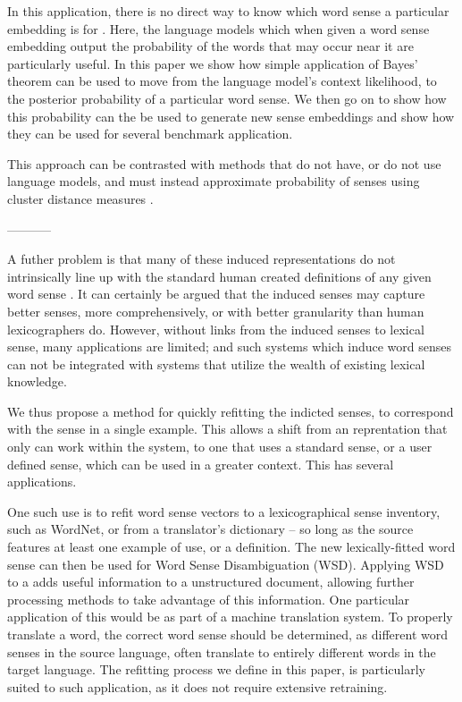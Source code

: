 \documentclass{sig-alternate}
\begin{document}
In this application, there is no direct way to know which word sense a particular embedding is for \parencite{Reisinger2010,Huang2012,AdaGrams}.
Here, the language models which when given a word sense embedding output the probability of the words that may occur near it are particularly useful. In this paper we show how simple application of Bayes' theorem can be used to move from the language model's context likelihood, to the posterior probability of a particular word sense. We then go on to show how this probability can the be used to generate new sense embeddings and show how they can be used for several benchmark application.

This approach can be contrasted with methods that do not have, or do not use language models, and must instead approximate probability of senses using cluster distance measures \parencite{Reisinger2010,Huang2012}.

-----------



A futher problem is that many of these induced representations do not intrinsically line up with the standard human created definitions of any given word sense \parencite{Reisinger2010,Huang2012,AdaGrams}.
It can certainly be argued that the induced senses may capture better senses, more comprehensively, or with better granularity than human lexicographers do.
However, without links from the induced senses to lexical sense, many applications are limited; and such systems which induce word senses can not be integrated with systems that utilize the wealth of existing lexical knowledge.

We thus propose a method for quickly refitting the indicted senses, to correspond with the sense in a single example. This allows a shift from an reprentation that only can work within the system, to one that uses a standard sense, or a user defined sense, which can be used in a greater context. This has several applications.


One such use is to refit word sense vectors to a lexicographical sense inventory, such as WordNet, or from a translator's dictionary -- so long as the source features at least one example of use, or a definition. The new lexically-fitted word sense can then be used for Word Sense Disambiguation (WSD). Applying WSD to a adds useful information to a unstructured document, allowing further processing methods to take advantage of this information. One particular application of this would be as part of a machine translation system. To properly translate a word, the correct word sense should be determined, as different word senses in the source language, often translate to entirely different words in the target language. The refitting process we define in this paper, is particularly suited to such application, as it does not require extensive retraining.
\end{document}

